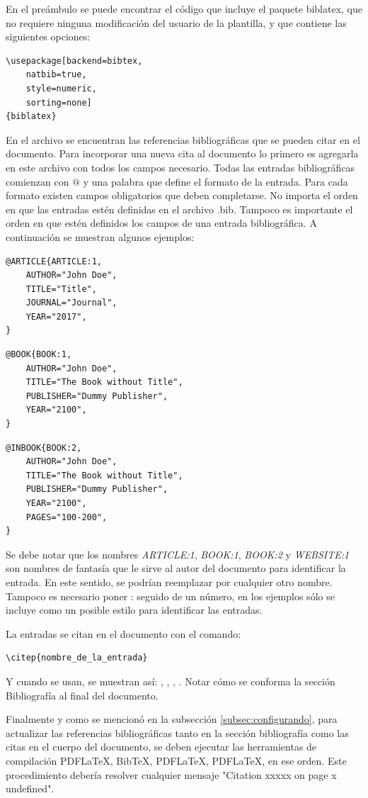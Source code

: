 En el preámbulo se puede encontrar el código que incluye el paquete biblatex, que no requiere ninguna modificación del usuario de la plantilla, y que contiene las siguientes opciones:

\begin{lstlisting}
\usepackage[backend=bibtex,
	natbib=true, 
	style=numeric, 
	sorting=none]
{biblatex}
\end{lstlisting}

En el archivo  se encuentran las referencias bibliográficas que se pueden citar en el documento.  Para incorporar una nueva cita al documento lo primero es agregarla en este archivo con todos los campos necesario.  Todas las entradas bibliográficas comienzan con $@$ y una palabra que define el formato de la entrada.  Para cada formato existen campos obligatorios que deben completarse. No importa el orden en que las entradas estén definidas en el archivo .bib.  Tampoco es importante el orden en que estén definidos los campos de una entrada bibliográfica. A continuación se muestran algunos ejemplos:

\begin{lstlisting}
@ARTICLE{ARTICLE:1,
    AUTHOR="John Doe",
    TITLE="Title",
    JOURNAL="Journal",
    YEAR="2017",
}
\end{lstlisting}


\begin{lstlisting}
@BOOK{BOOK:1,
    AUTHOR="John Doe",
    TITLE="The Book without Title",
    PUBLISHER="Dummy Publisher",
    YEAR="2100",
}
\end{lstlisting}


\begin{lstlisting}
@INBOOK{BOOK:2,
    AUTHOR="John Doe",
    TITLE="The Book without Title",
    PUBLISHER="Dummy Publisher",
    YEAR="2100",
    PAGES="100-200",
}
\end{lstlisting}




Se debe notar que los nombres \emph{ARTICLE:1}, \emph{BOOK:1}, \emph{BOOK:2} y \emph{WEBSITE:1} son nombres de fantasía que le sirve al autor del documento para identificar la entrada. En este sentido, se podrían reemplazar por cualquier otro nombre.  Tampoco es necesario poner : seguido de un número, en los ejemplos sólo se incluye como un posible estilo para identificar las entradas.

La entradas se citan en el documento con el comando: 

\begin{verbatim}
\citep{nombre_de_la_entrada}
\end{verbatim}

Y cuando se usan, se muestran así: \citep{ARTICLE:1}, \citep{BOOK:1}, \citep{BOOK:2}, \citep{WEBSITE:1}.  Notar cómo se conforma la sección Bibliografía al final del documento.

Finalmente y como se mencionó en la subsección \ref{subsec:configurando}, para actualizar las referencias bibliográficas tanto en la sección bibliografía como las citas en el cuerpo del documento, se deben ejecutar las herramientas de compilación PDFLaTeX, BibTeX, PDFLaTeX, PDFLaTeX, en ese orden.  Este procedimiento debería resolver cualquier mensaje "Citation xxxxx on page x undefined".
